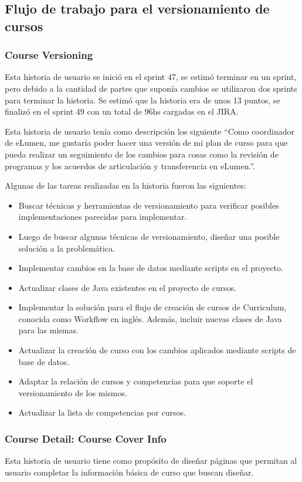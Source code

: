 \subsection{Flujo de trabajo para el versionamiento de cursos}
\subsubsection{Course Versioning}
Esta historia de usuario se inició en el sprint 47, se estimó terminar en un sprint, pero debido a la cantidad de partes que suponía cambios se utilizaron dos sprints para terminar la historia. Se estimó que la historia era de unos 13 puntos, se finalizó en el sprint 49 con un total de 96hs cargadas en el JIRA.

Esta historia de usuario tenía como descripción los siguiente “Como coordinador de eLumen, me gustaría poder hacer una versión de mi plan de curso para que pueda realizar un seguimiento de los cambios para cosas como la revisión de programas y los acuerdos de articulación y transferencia en eLumen.”.

Algunas de las tareas realizadas en la historia fueron las siguientes:

\begin{itemize}
	\item Buscar técnicas y herramientas de versionamiento para verificar posibles implementaciones parecidas para implementar.
	\item Luego de buscar algunas técnicas de versionamiento, diseñar una posible solución a la problemática.
	\item Implementar cambios en la base de datos mediante scripts en el proyecto.
	\item Actualizar clases de Java existentes en el proyecto de cursos.
	\item Implementar la solución para el flujo de creación de cursos de Curriculum, conocida como Workflow en inglés. Además, incluir nuevas clases de Java para las mismas.
	\item Actualizar la creación de curso con los cambios aplicados mediante scripts de base de datos.
	\item Adaptar la relación de cursos y competencias para que soporte el versionamiento de los mismos.
	\item Actualizar la lista de competencias por cursos.
\end{itemize}

\subsubsection{Course Detail: Course Cover Info}
Esta historia de usuario tiene como propósito de diseñar páginas que permitan al usuario completar la información básica de curso que buscan diseñar.

